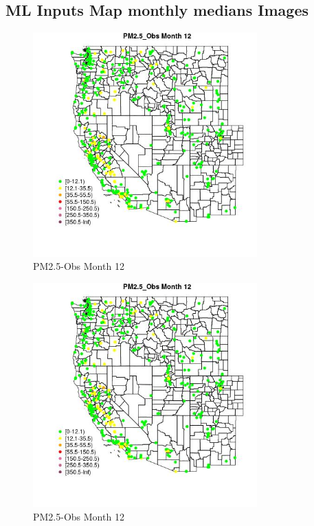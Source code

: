 \subsection{ML Inputs Map monthly medians Images} 
 

\begin{figure} 
\centering  
\includegraphics[width=0.77\textwidth]{Code_Outputs/ML_input_report_ML_input_PM25_Step5_part_d_de_duplicated_aves_ML_input_MapObsMo12PM25_Obs.jpg} 
\caption{\label{fig:ML_input_report_ML_input_PM25_Step5_part_d_de_duplicated_aves_ML_inputMapObsMo12PM25_Obs}PM2.5-Obs Month 12} 
\end{figure} 
 

\begin{figure} 
\centering  
\includegraphics[width=0.77\textwidth]{Code_Outputs/ML_input_report_ML_input_PM25_Step5_part_d_de_duplicated_aves_ML_input_MapObsMo12PM25_Obs.jpg} 
\caption{\label{fig:ML_input_report_ML_input_PM25_Step5_part_d_de_duplicated_aves_ML_inputMapObsMo12PM25_Obs}PM2.5-Obs Month 12} 
\end{figure} 
 

